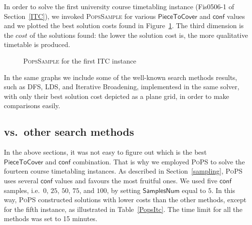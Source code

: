 \documentclass{ws-ijait}
\begin{document}
In order to solve the first university course timetabling instance (\textsf{Fis0506-1} of Section~\ref{ITC}), we invoked \textsc{PopsSample} for various $\mathsf{PieceToCover}$ and $\mathsf{conf}$ values and we plotted the best solution costs found in Figure~\ref{ITC1}. The third dimension is the $cost$ of the solutions found: the lower the solution cost is, the more qualitative timetable is produced.

\begin{figure}
\centering

\caption{{\normalfont\textsc{PopsSample}} for the first ITC instance\label{ITC1}}
\end{figure}

In the same graphs we include some of the well-known search methods results, such as DFS, LDS, and Iterative Broadening, implementesd in the same solver, with only their best solution cost depicted as a plane grid, in order to make comparisons easily.


\subsection{\PoPS{} vs.\ other search methods}

In the above sections, it was not easy to figure out which is the best $\mathsf{PieceToCover}$ and $\mathsf{conf}$ combination. That is why we employed \textsc{PoPS} to solve the fourteen course timetabling instances. As described in Section~\ref{sampling}, \textsc{PoPS} uses several $\mathsf{conf}$ values and favours the most fruitful ones. We used five $\mathsf{conf}$ samples, i.e.\ $0$, $25$, $50$, $75$, and $100$, by setting $\mathsf{SamplesNum}$ equal to $5$. In this way, \textsc{PoPS} constructed solutions with lower costs than the other methods, except for the fifth instance, as illustrated in Table~\ref{PopsItc}. The time limit for all the methods was set to 15 minutes.
\end{document}
